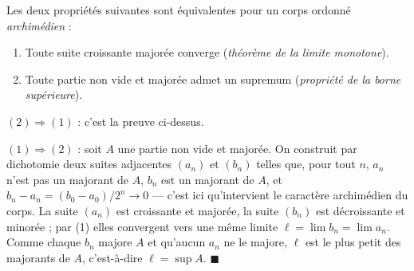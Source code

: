 \begin{mdframed}[style=proofbar]
  Les deux propriétés suivantes sont équivalentes pour un corps ordonné
  \emph{archimédien} :
  \begin{enumerate}
    \item Toute suite croissante majorée converge (\emph{théorème de la limite
          monotone}).
    \item Toute partie non vide et majorée admet un supremum (\emph{propriété
          de la borne supérieure}).
  \end{enumerate}
  \textit{$(2) \Rightarrow (1)$} : c'est la preuve ci-dessus.

  \textit{$(1) \Rightarrow (2)$} : soit $A$ une partie non vide et majorée.
  On construit par dichotomie deux suites adjacentes $(a_n)$ et $(b_n)$ telles
  que, pour tout $n$, $a_n$ n'est pas un majorant de $A$, $b_n$ est un majorant
  de $A$, et $b_n - a_n = (b_0 - a_0)/2^n \to 0$ — c'est ici qu'intervient le
  caractère archimédien du corps. La suite $(a_n)$ est croissante et majorée, la
  suite $(b_n)$ est décroissante et minorée ; par (1) elles convergent vers une
  même limite $\ell = \lim b_n = \lim a_n$. Comme chaque $b_n$ majore $A$ et
  qu'aucun $a_n$ ne le majore, $\ell$ est le plus petit des majorants de $A$,
  c'est-à-dire $\ell = \sup A$. \hfill$\blacksquare$
\end{mdframed}

\decsep{}



